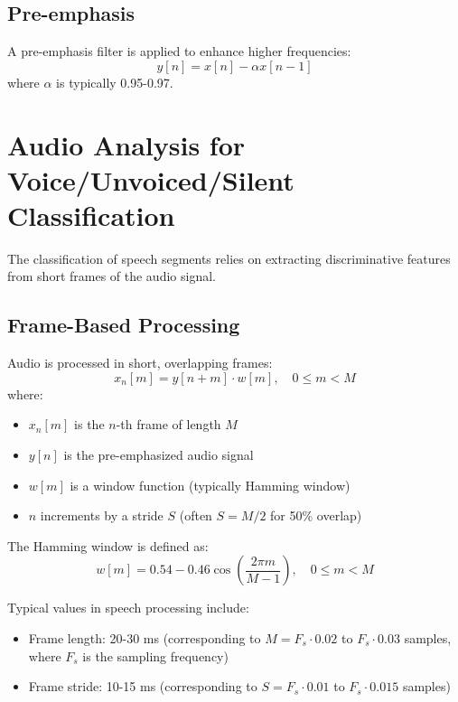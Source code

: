 \documentclass[10pt,journal,compsoc]{IEEEtran}
\begin{document}
\subsection{Pre-emphasis}
A pre-emphasis filter is applied to enhance higher frequencies:
\begin{equation}
y[n] = x[n] - \alpha x[n-1]
\end{equation}
where $\alpha$ is typically 0.95-0.97.

\section{Audio Analysis for Voice/Unvoiced/Silent Classification}
The classification of speech segments relies on extracting discriminative features from short frames of the audio signal.

\subsection{Frame-Based Processing}
Audio is processed in short, overlapping frames:
\begin{equation}
x_n[m] = y[n+m] \cdot w[m], \quad 0 \leq m < M
\end{equation}
where:
\begin{itemize}
    \item $x_n[m]$ is the $n$-th frame of length $M$
    \item $y[n]$ is the pre-emphasized audio signal
    \item $w[m]$ is a window function (typically Hamming window)
    \item $n$ increments by a stride $S$ (often $S = M/2$ for 50\% overlap)
\end{itemize}

The Hamming window is defined as:
\begin{equation}
w[m] = 0.54 - 0.46 \cos\left(\frac{2\pi m}{M-1}\right), \quad 0 \leq m < M
\end{equation}

Typical values in speech processing include:
\begin{itemize}
    \item Frame length: 20-30 ms (corresponding to $M = F_s \cdot 0.02$ to $F_s \cdot 0.03$ samples, where $F_s$ is the sampling frequency)
    \item Frame stride: 10-15 ms (corresponding to $S = F_s \cdot 0.01$ to $F_s \cdot 0.015$ samples)
\end{itemize}
\end{document}
